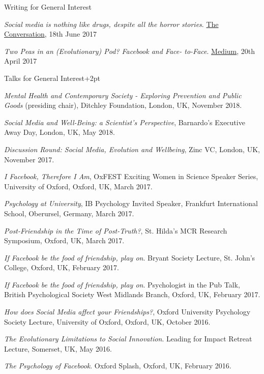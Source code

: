 \documentclass{resume} %
\begin{document}
\begin{rSection}{Writing for General Interest}
\item \textit{Social media is nothing like drugs, despite all the horror stories}. {\href{https://theconversation.com/social-media-is-nothing-like-drugs-despite-all-the-horror-stories-79382}{The Conversation}}, 18th June 2017

\item \textit{Two Peas in an (Evolutionary) Pod? Facebook and Face- to-Face}. {\href{https://medium.com/@OrbenAmy/two-peas-in-an-evolutionary-pod-facebook-and-face-to-face-f30bfdfaac89}{Medium}}, 20th April 2017

\end{rSection}


\begin{rSection}{Talks for General Interest}\itemsep +2pt

\item \textit{Mental Health and Contemporary Society - Exploring Prevention and Public Goods} (presiding chair), Ditchley Foundation, London, UK, November 2018.

\item \textit{Social Media and Well-Being: a Scientist’s Perspective}, Barnardo’s Executive Away Day, London, UK, May 2018.

\item \textit{Discussion Round: Social Media, Evolution and Wellbeing}, Zinc VC, London, UK, November 2017.

\item \textit{I Facebook, Therefore I Am}, OxFEST Exciting Women in Science Speaker Series, University of Oxford, Oxford, UK, March 2017.

\item \textit{Psychology at University}, IB Psychology Invited Speaker, Frankfurt International School, Oberursel, Germany, March 2017.

\item \textit{Post-Friendship in the Time of Post-Truth?}, St. Hilda’s MCR Research Symposium, Oxford, UK, March 2017.

\item \textit{If Facebook be the food of friendship, play on}. Bryant Society Lecture, St. John’s College, Oxford, UK, February 2017.

\item \textit{If Facebook be the food of friendship, play on}. Psychologist in the Pub Talk, British Psychological Society West Midlands Branch, Oxford, UK, February 2017.

\item \textit{How does Social Media affect your Friendships?}, Oxford University Psychology Society Lecture, University of Oxford, Oxford, UK, October 2016.

\item \textit{The Evolutionary Limitations to Social Innovation}. Leading for Impact Retreat Lecture, Somerset, UK, May 2016.

\item \textit{The Psychology of Facebook}. Oxford Splash, Oxford, UK, February 2016.

\end{rSection}
\end{document}
